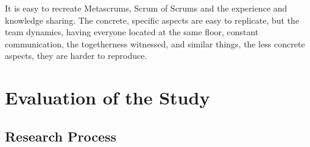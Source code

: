 \begin{fancyquotes}
It is easy to recreate Metascrums, Scrum of Scrums and the experience and knowledge sharing. The concrete, specific aspects are easy to replicate, but the team dynamics, having everyone located at the same floor, constant communication, the togetherness witnessed, and similar things, the less concrete aspects, they are harder to reproduce.
\end{fancyquotes}

\section{Evaluation of the Study}

\subsection{Research Process}

